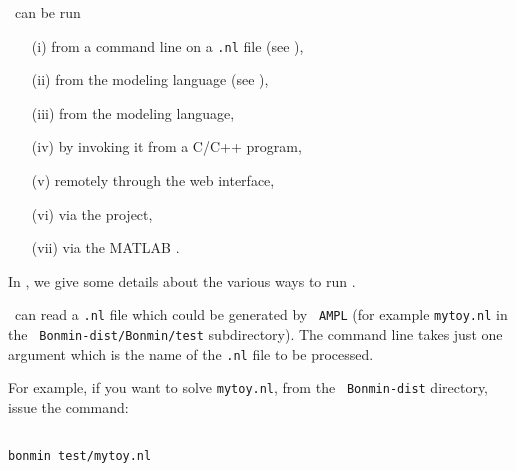 
\begin{PageSummary}
\end{PageSummary}

\begin{quickref}
\end{quickref}


\Bonmin\ can be run
\begin{itemize}
\item [(i)] from a command line on a {\tt .nl} file
(see ),
\item [(ii)] from the modeling language  (see
),
\item[(iii)] from the  modeling language,
\item [(iv)] by invoking it from a C/C++ program,
\item[(v)] remotely through the  web interface,
\item[(vi)] via the  project,
\item[(vii)] via the MATLAB .
\end{itemize}

In , we give some details about the
various ways to run \Bonmin.

\Bonmin\ can read a {\tt .nl} file which could be generated by {\tt
AMPL} (for example {\tt mytoy.nl} in the {\tt
Bonmin-dist/Bonmin/test} subdirectory). The command line takes just
one argument which is the name of the {\tt .nl} file to be
processed.

For example, if you want to solve {\tt mytoy.nl}, from the {\tt
Bonmin-dist} directory, issue the command:

\begin{colorverb}
\begin{verbatim}

bonmin test/mytoy.nl

\end{verbatim}
\end{colorverb}

